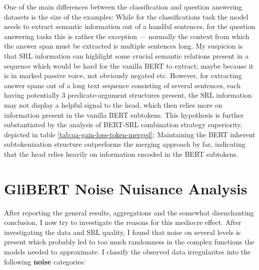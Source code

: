 \label{chap:5_discussion}


One of the main differences between the classification and question answering datasets is the size of
the examples: While for the classifications task the model needs to extract semantic
information out of a handful sentences, for the question answering tasks this is rather the exception ---
normally the context from which the answer span must be extracted is multiple sentences long. My suspicion
is that SRL information can highlight some crucial semantic relations present in a sequence which would be
hard for the vanilla BERT to extract; maybe because it is in marked passive voice, not obviously negated etc.
However, for extracting answer spans out of a long text sequence consisting of several sentences, each having
potentially 3 predicate-argument structures present, the SRL information may not display a helpful signal to the
head, which then relies more on information present in the vanilla BERT subtokens. This hypothesis is further
substantiated by the analysis of BERT-SRL combination strategy superiority, depicted in table \ref{tab:qa-gain-loss-token-merged}:
Maintaining the BERT inherent subtokenization structure outperforms the merging approach by far, indicating that
the head relies heavily on information encoded in the BERT subtokens.


\section{GliBERT Noise Nuisance Analysis}
\label{sec:glinoise}


After reporting the general results, aggregations and the somewhat disenchanting conclusion, I
now try to investigate the reasons for this mediocre effect. After investigating the data and
SRL quality, I found that noise on several levels is present which probably led to too much
randomness in the complex functions the models needed to approximate. I classify the observed
data irregularites into the following \textbf{noise} categories:


